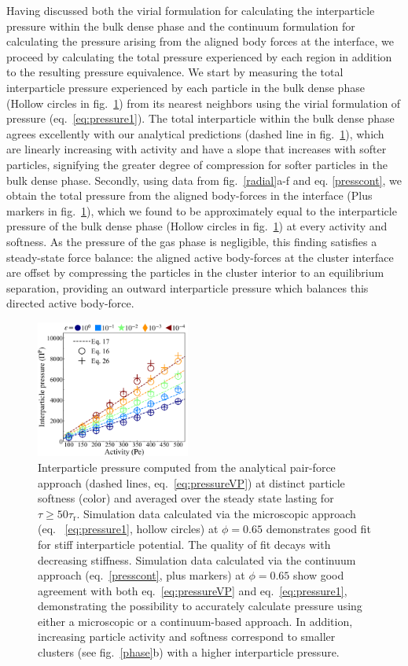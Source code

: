 \documentclass[twoside,twocolumn,9pt]{article}
\begin{document}
Having discussed both the virial formulation for calculating the interparticle pressure within the bulk dense phase and the continuum formulation for calculating the pressure arising from the aligned body forces at the interface, we proceed by calculating the total pressure experienced by each region in addition to the resulting pressure equivalence. We start by measuring the total interparticle pressure experienced by each particle in the bulk dense phase (Hollow circles in fig.~\ref{pressurerad}) from its nearest neighbors using the virial formulation of pressure (eq.~\ref{eq:pressure1}).  The total interparticle within the bulk dense phase agrees excellently with our analytical predictions (dashed line in fig.~\ref{pressurerad}), which are linearly increasing with activity and have a slope that increases with softer particles, signifying the greater degree of compression for softer particles in the bulk dense phase. Secondly, using data from fig.~\ref{radial}a-f and eq. \ref{presscont}, we obtain the total pressure from the aligned body-forces in the interface (Plus markers in fig.~\ref{pressurerad}), which we found to be approximately equal to the interparticle pressure of the bulk dense phase (Hollow circles in fig.~\ref{pressurerad}) at every activity and softness. As the pressure of the gas phase is negligible, this finding satisfies a steady-state force balance: the aligned active body-forces at the cluster interface are offset by compressing the particles in the cluster interior to an equilibrium separation, providing an outward interparticle pressure which balances this directed active body-force. 

\begin{figure}
\centering
  \includegraphics[width=0.45\textwidth, trim={0. 0. 0.1cm 0.3cm},clip]{figure_8.png}
  \caption{Interparticle pressure computed from the analytical pair-force approach (dashed lines, eq.~\ref{eq:pressureVP}) at distinct particle softness (color) and averaged over the steady state lasting for $\tau\ge50\tau_\text{r}$. Simulation data calculated via the microscopic approach (eq. ~\ref{eq:pressure1}, hollow circles) at $\phi=0.65$ demonstrates good fit for stiff interparticle potential. The quality of fit decays with decreasing stiffness. Simulation data  calculated via the continuum approach (eq.~\ref{presscont}, plus markers) at $\phi=0.65$ show good agreement with both eq.~\ref{eq:pressureVP} and eq.~\ref{eq:pressure1}, demonstrating the possibility to accurately calculate pressure using either a microscopic or a continuum-based approach. In addition, increasing particle activity and softness correspond to smaller clusters (see fig.~\ref{phase}b) with a higher interparticle pressure.}
  \label{pressurerad}
\end{figure}
\end{document}
